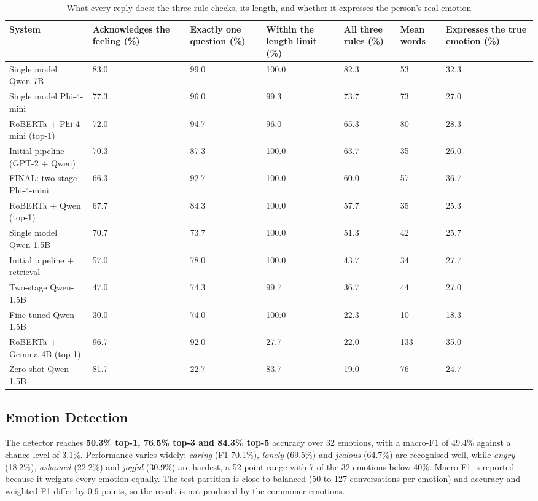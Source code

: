 \begin{table}[H]
\centering
\scriptsize
\begin{tabularx}{\textwidth}{@{}lXXXXXX@{}}
\toprule
\textbf{System} & \textbf{Acknowledges the feeling (\%)} & \textbf{Exactly one question (\%)} & \textbf{Within the length limit (\%)} & \textbf{All three rules (\%)} & \textbf{Mean words} & \textbf{Expresses the true emotion (\%)} \\
\midrule
Single model Qwen-7B & 83.0 & 99.0 & 100.0 & 82.3 & 53 & 32.3 \\
Single model Phi-4-mini & 77.3 & 96.0 & 99.3 & 73.7 & 73 & 27.0 \\
RoBERTa + Phi-4-mini (top-1) & 72.0 & 94.7 & 96.0 & 65.3 & 80 & 28.3 \\
Initial pipeline (GPT-2 + Qwen) & 70.3 & 87.3 & 100.0 & 63.7 & 35 & 26.0 \\
FINAL: two-stage Phi-4-mini & 66.3 & 92.7 & 100.0 & 60.0 & 57 & 36.7 \\
RoBERTa + Qwen (top-1) & 67.7 & 84.3 & 100.0 & 57.7 & 35 & 25.3 \\
Single model Qwen-1.5B & 70.7 & 73.7 & 100.0 & 51.3 & 42 & 25.7 \\
Initial pipeline + retrieval & 57.0 & 78.0 & 100.0 & 43.7 & 34 & 27.7 \\
Two-stage Qwen-1.5B & 47.0 & 74.3 & 99.7 & 36.7 & 44 & 27.0 \\
Fine-tuned Qwen-1.5B & 30.0 & 74.0 & 100.0 & 22.3 & 10 & 18.3 \\
RoBERTa + Gemma-4B (top-1) & 96.7 & 92.0 & 27.7 & 22.0 & 133 & 35.0 \\
Zero-shot Qwen-1.5B & 81.7 & 22.7 & 83.7 & 19.0 & 76 & 24.7 \\
\bottomrule
\end{tabularx}
\caption{What every reply does: the three rule checks, its length, and whether it expresses the person's real emotion}
\label{tab:5.1}
\end{table}

\subsection{Emotion Detection}
\label{sec:5.1.2}

The detector reaches \textbf{50.3\% top-1, 76.5\% top-3 and 84.3\% top-5 }accuracy over 32 emotions, with a macro-F1 of 49.4\% against a chance level of 3.1\%. Performance varies widely: \textit{caring} (F1 70.1\%), \textit{lonely }(69.5\%) and \textit{jealous} (64.7\%) are recognised well, while\textit{ angry }(18.2\%),\textit{ ashamed }(22.2\%) and\textit{ joyful} (30.9\%) are hardest, a 52-point range with 7 of the 32 emotions below 40\%. Macro-F1 is reported because it weights every emotion equally. The test partition is close to balanced (50 to 127 conversations per emotion) and accuracy and weighted-F1 differ by 0.9 points, so the result is not produced by the commoner emotions.

